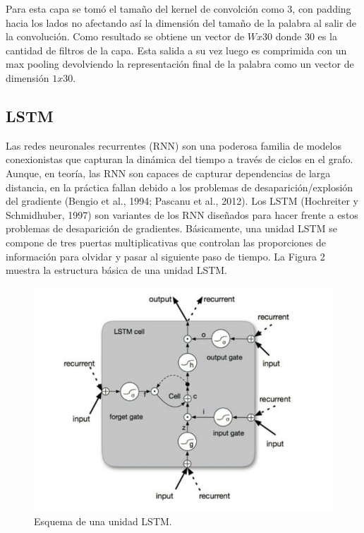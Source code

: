 \documentclass[runningheads]{llncs}
\begin{document}
\newpage

Para esta capa se tomó el tamaño del kernel de convolción como 3, con padding hacia los lados 
no afectando así la dimensión del tamaño de la palabra al salir de la convolución. Como resultado
se obtiene un vector de $Wx30$ donde 30 es la cantidad de filtros de la capa. Esta salida a su vez
luego es comprimida con un max pooling devolviendo la representación final de la palabra como un
vector de dimensión $1x30$.

\subsection{LSTM}
	
Las redes neuronales recurrentes (RNN) son una poderosa familia de modelos conexionistas que capturan 
la dinámica del tiempo a través de ciclos en el grafo. Aunque, en teoría, las RNN son capaces de 
capturar dependencias de larga distancia, en la práctica fallan debido a los problemas de 
desaparición/explosión del gradiente (Bengio et al., 1994; Pascanu et al., 2012). Los LSTM 
(Hochreiter y Schmidhuber, 1997) son variantes de los RNN diseñados para hacer frente a estos 
problemas de desaparición de gradientes. Básicamente, una unidad LSTM se compone de tres puertas
multiplicativas que controlan las proporciones de información para olvidar y pasar al siguiente 
paso de tiempo. La Figura 2 muestra la estructura básica de una unidad LSTM.

\begin{figure}
	\centering
	\includegraphics[width=12cm]{Fig_2.png}
	\caption{  Esquema de una unidad LSTM.}
	\label{F2}
\end{figure}
\end{document}
